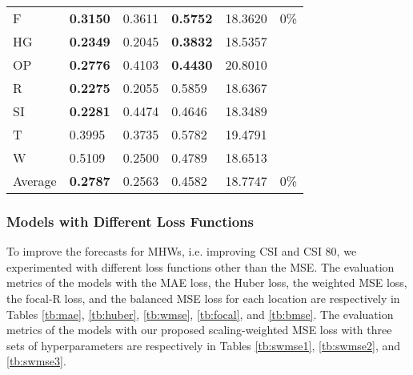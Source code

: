 \documentclass[11pt, a4paper]{article}
\begin{document}
\begin{table}[H]
\begin{tabular}{llllll}
F                             & \textbf{0.3150}                   & 0.3611                            & \textbf{0.5752}                      & 18.3620                                     & 0\%                               \\
HG                          & \textbf{0.2349}                   & 0.2045                            & \textbf{0.3832}                      & 18.5357                                     &                                   \\
OP                       & \textbf{0.2776}                   & 0.4103                            & \textbf{0.4430}                      & 20.8010                                     &                                   \\
R                                & \textbf{0.2275}                   & 0.2055                            & 0.5859                               & 18.6367                                     &                                   \\
SI                        & \textbf{0.2281}                   & 0.4474                            & 0.4646                               & 18.3489                                     &                                   \\
T                              & 0.3995                            & 0.3735                            & 0.5782                               & 19.4791                                     &                                   \\
W                             & 0.5109                            & 0.2500                            & 0.4789                               & 18.6513                                     &                                   \\ \hline
Average                               & \textbf{0.2787}                   & 0.2563                            & 0.4582                               & 18.7747                                     & 0\%
\end{tabular}
\end{table}

\subsubsection{Models with Different Loss Functions}

To improve the forecasts for MHWs, i.e. improving CSI and CSI 80, we experimented with different loss functions other than the MSE. The evaluation metrics of the models with the MAE loss, the Huber loss, the weighted MSE loss, the focal-R loss, and the balanced MSE loss for each location are respectively in Tables \ref{tb:mae}, \ref{tb:huber}, \ref{tb:wmse}, \ref{tb:focal}, and \ref{tb:bmse}. The evaluation metrics of the models with our proposed scaling-weighted MSE loss with three sets of hyperparameters are respectively in Tables \ref{tb:swmse1}, \ref{tb:swmse2}, and \ref{tb:swmse3}.
\end{document}
